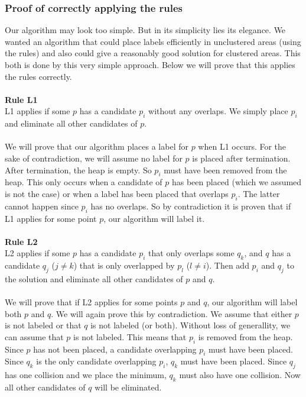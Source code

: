 \documentclass[crop=false,a4paper,oneside,11pt]{article}
\begin{document}
\subsubsection{Proof of correctly applying the rules}
Our algorithm may look too simple. But in its simplicity lies its elegance. We wanted an algorithm that could place labels efficiently in unclustered areas (using the rules) and also could give a reasonably good solution for clustered areas. This both is done by this very simple approach. Below we will prove that this applies the rules correctly.\\
\\
\textbf{Rule L1}\\
L1 applies if some $p$ has a candidate $p_i$ without any overlaps. We simply place $p_i$ and eliminate all other candidates of $p$.\\
\\
We will prove that our algorithm places a label for $p$ when L1 occurs. For the sake of contradiction, we will assume no label for $p$ is placed after termination. After termination, the heap is empty. So $p_i$ must have been removed from the heap. This only occurs when a candidate of $p$ has been placed (which we assumed is not the case) or when a label has been placed that overlaps $p_i$. The latter cannot happen since $p_i$ has no overlaps. So by contradiction it is proven that if L1 applies for some point $p$, our algorithm will label it.\\
\\
\textbf{Rule L2}\\
L2 applies if some $p$ has a candidate $p_i$ that only overlaps some $q_k$, and $q$ has a
candidate $q_j$ ($j \neq k$) that is only overlapped by $p_l$ ($l \neq i$). Then add $p_i$
and $q_j$ to the solution and eliminate all other candidates of $p$ and $q$.\\
\\
We will prove that if L2 applies for some points $p$ and $q$, our algorithm will label both $p$ and $q$. We will again prove this by contradiction. We assume that either $p$ is not labeled or that $q$ is not labeled (or both). Without loss of generallity, we can assume that $p$ is not labeled. This means that $p_i$ is removed from the heap. Since $p$ has not been placed, a candidate overlapping $p_i$ must have been placed. Since $q_k$ is the only candidate overlapping $p_i$, $q_k$ must have been placed. Since $q_j$ has one collision and we place the minimum, $q_k$ must also have one collision. Now all other candidates of $q$ will be eliminated.\\
\end{document}
